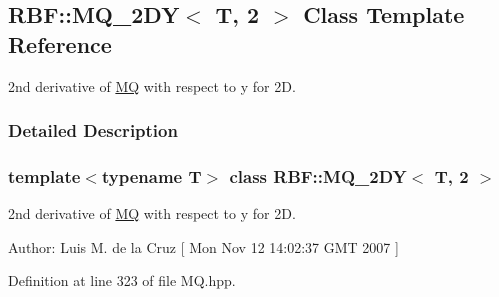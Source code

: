 \hypertarget{classRBF_1_1MQ__2DY_3_01T_00_012_01_4}{
\subsection{RBF::MQ\_\-2DY$<$ T, 2 $>$ Class Template Reference}
\label{classRBF_1_1MQ__2DY_3_01T_00_012_01_4}
}
2nd derivative of \hyperlink{classRBF_1_1MQ}{MQ} with respect to y for 2D.  




\subsubsection{Detailed Description}
\subsubsection*{template$<$typename T$>$ class RBF::MQ\_\-2DY$<$ T, 2 $>$}

2nd derivative of \hyperlink{classRBF_1_1MQ}{MQ} with respect to y for 2D. 

\begin{Desc}
\item[Author:]Luis M. de la Cruz \mbox{[} Mon Nov 12 14:02:37 GMT 2007 \mbox{]} \end{Desc}


Definition at line 323 of file MQ.hpp.